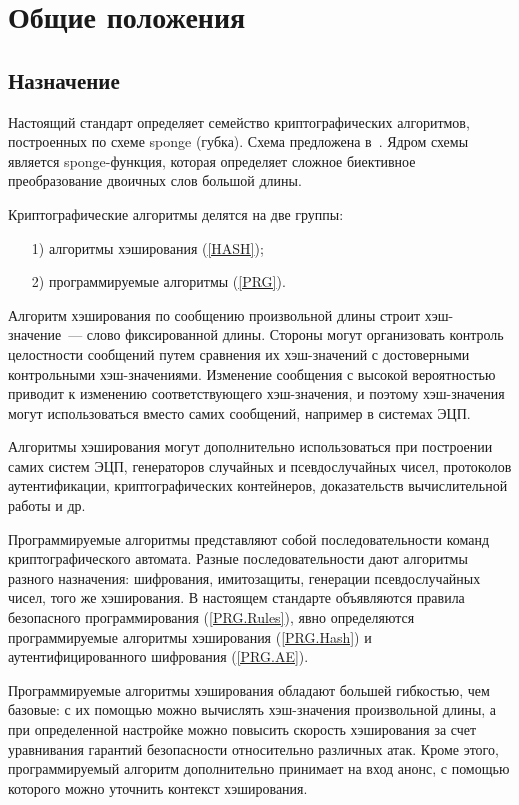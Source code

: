 \chapter{Общие положения}\label{COMMON}

\section{Назначение}

Настоящий стандарт определяет семейство криптографических алгоритмов,
построенных по схеме sponge (губка). Схема предложена в~\cite{Sponge}. 
Ядром схемы является sponge-функция, которая определяет сложное биективное 
преобразование двоичных слов большой длины. 

Криптографические алгоритмы делятся на две группы:
\begin{enumerate}
\item[1)]
алгоритмы хэширования (\ref{HASH});
\item[2)]
программируемые алгоритмы (\ref{PRG}).
\end{enumerate}

Алгоритм хэширования по сообщению произвольной длины строит 
хэш-значение~--- слово фиксированной длины.
%
Стороны могут организовать контроль целостности сообщений
путем сравнения их хэш-значений с достоверными контрольными хэш-значениями.
%
Изменение сообщения с высокой вероятностью приводит к изменению
соответствующего хэш-значения, и поэтому хэш-значения могут использоваться
вместо самих сообщений, например в системах ЭЦП.

Алгоритмы хэширования могут дополнительно использоваться при построении 
самих систем ЭЦП, генераторов случайных и псевдослучайных чисел, 
протоколов аутентификации,
криптографических контейнеров, 
доказательств вычислительной работы и др.

Программируемые алгоритмы представляют собой последовательности команд 
криптографического автомата. Разные последовательности дают алгоритмы разного 
назначения: шифрования, имитозащиты, генерации псевдослучайных чисел, 
того же хэширования.
%
В настоящем стандарте объявляются 
правила безопасного программирования (\ref{PRG.Rules}),
явно определяются программируемые алгоритмы хэширования (\ref{PRG.Hash}) 
и аутентифицированного шифрования (\ref{PRG.AE}).

Программируемые алгоритмы хэширования обладают большей гибкостью, чем базовые: 
с их помощью можно вычислять хэш-значения произвольной длины,
а при определенной настройке можно повысить скорость хэширования 
за счет уравнивания гарантий безопасности относительно различных атак.
%
Кроме этого, программируемый алгоритм дополнительно принимает на вход анонс,
с помощью которого можно уточнить контекст хэширования.


